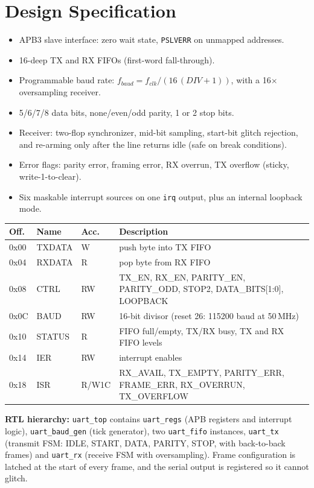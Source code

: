 \documentclass[11pt,a4paper]{article}
\newcommand{\sect}[1]{\section{\textcolor{accent}{#1}}}
\begin{document}
\sect{Design Specification}
\begin{itemize}
\item APB3 slave interface: zero wait state, \texttt{PSLVERR} on unmapped addresses.
\item 16-deep TX and RX FIFOs (first-word fall-through).
\item Programmable baud rate: $f_{baud} = f_{clk} / (16\,(DIV+1))$, with a 16$\times$ oversampling receiver.
\item 5/6/7/8 data bits, none/even/odd parity, 1 or 2 stop bits.
\item Receiver: two-flop synchronizer, mid-bit sampling, start-bit glitch rejection, and re-arming only after the line returns idle (safe on break conditions).
\item Error flags: parity error, framing error, RX overrun, TX overflow (sticky, write-1-to-clear).
\item Six maskable interrupt sources on one \texttt{irq} output, plus an internal loopback mode.
\end{itemize}

\begin{center}
\small
\begin{tabular}{lllp{9.2cm}}
\toprule
\textbf{Off.} & \textbf{Name} & \textbf{Acc.} & \textbf{Description}\\
\midrule
0x00 & TXDATA & W & push byte into TX FIFO \\
0x04 & RXDATA & R & pop byte from RX FIFO \\
0x08 & CTRL & RW & TX\_EN, RX\_EN, PARITY\_EN, PARITY\_ODD, STOP2, DATA\_BITS[1:0], LOOPBACK \\
0x0C & BAUD & RW & 16-bit divisor (reset 26: 115200 baud at 50\,MHz) \\
0x10 & STATUS & R & FIFO full/empty, TX/RX busy, TX and RX FIFO levels \\
0x14 & IER & RW & interrupt enables \\
0x18 & ISR & R/W1C & RX\_AVAIL, TX\_EMPTY, PARITY\_ERR, FRAME\_ERR, RX\_OVERRUN, TX\_OVERFLOW \\
\bottomrule
\end{tabular}
\end{center}

\textbf{RTL hierarchy:} \texttt{uart\_top} contains \texttt{uart\_regs} (APB registers and interrupt logic), \texttt{uart\_baud\_gen} (tick generator), two \texttt{uart\_fifo} instances, \texttt{uart\_tx} (transmit FSM: IDLE, START, DATA, PARITY, STOP, with back-to-back frames) and \texttt{uart\_rx} (receive FSM with oversampling). Frame configuration is latched at the start of every frame, and the serial output is registered so it cannot glitch.
\end{document}
